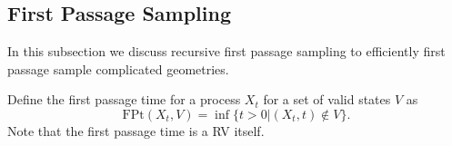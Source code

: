\documentclass[a4paper,12pt]{article}
\begin{document}

\subsection{First Passage Sampling}

In this subsection we discuss recursive first passage sampling to efficiently
first passage sample complicated geometries.


\begin{definition} \label{def:first passage time}
  Define the first passage time for a process $X_{t}$ for a set of valid states
  $V$ as
  \begin{equation}
    \text{FPt}(X_{t},V)=\inf \{t>0| (X_{t},t) \notin V \}
    .
  \end{equation}
  Note that the first passage time is a RV itself.
\end{definition}
\end{document}
